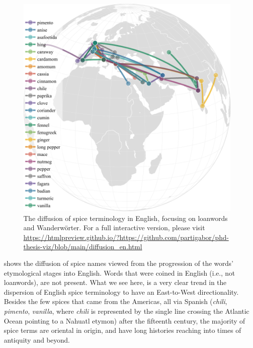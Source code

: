 \begin{figure}[ht!]
  \includegraphics[width=\linewidth]{imgs/plots/diffusion_en.pdf}
  \caption[The diffusion of spice terminology in English.]{The diffusion of spice terminology in English, focusing on loanwords and Wanderwörter. For a full interactive version, please visit \url{https://htmlpreview.github.io/?https://github.com/partigabor/phd-thesis-viz/blob/main/diffusion_en.html}}
  \label{fig:diffusion_en}
\end{figure}

 shows the diffusion of spice names viewed from the progression of the words' etymological stages into English. Words that were coined in English (i.e., not loanwords), are not present. What we see here, is a very clear trend in the dispersion of English spice terminology to have an East-to-West directionality. Besides the few spices that came from the Americas, all via Spanish (\textit{chili}, \textit{pimento}, \textit{vanilla}, where \textit{chili} is represented by the single line crossing the Atlantic Ocean pointing to a Nahuatl etymon) after the fifteenth century, the majority of spice terms are oriental in origin, and have long histories reaching into times of antiquity and beyond. 

